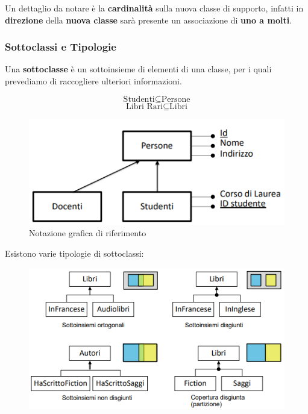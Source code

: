 \documentclass{article}
\begin{document}
Un dettaglio da notare è la \textbf{cardinalità} sulla nuova classe di supporto, infatti in \textbf{direzione} della \textbf{nuova classe} sarà presente un associazione di \textbf{uno a molti}.

\newpage

\subsubsection{Sottoclassi e Tipologie}

Una \textbf{sottoclasse} è un sottoinsieme di elementi di una classe, per i quali prevediamo di raccogliere ulteriori informazioni.

\[ \text{Studenti} \subseteq \text{Persone} \]
\[ \text{Libri Rari} \subseteq \text{Libri} \]

\begin{figure}[htbp]
    \center
    \includegraphics[scale=0.7]{img/notazioneGraficaSottoclassi.png}
    \caption{Notazione grafica di riferimento}
\end{figure}

\vspace*{10px}

Esistono varie tipologie di sottoclassi:

\vspace*{10px}

\begin{figure}[htbp]
    \center
    \includegraphics[scale=0.7]{img/tipiDiSottoclassi.png}
\end{figure}
\end{document}
